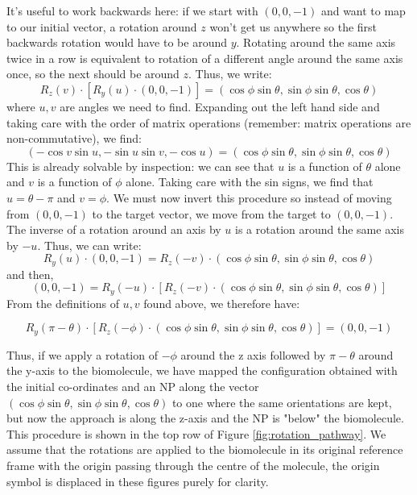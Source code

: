 \documentclass[10pt,a4paper,onecolumn]{report}
\begin{document}
It's useful to work backwards here: if we start with $(0,0,-1)$ and want to map to our initial vector, a rotation around $z$ won't get us anywhere so the first backwards rotation would have to be around $y$. Rotating around the same axis twice in a row is equivalent to rotation of a different angle around the same axis once, so the next should be around $z$. Thus, we write:
\begin{equation}
R_z(v) \cdot \left[R_y(u) \cdot (0,0,-1) \right] = ( \cos \phi \sin \theta,  \sin \phi \sin \theta,  \cos \theta)
\end{equation}
where $u,v$ are angles we need to find. Expanding out the left hand side and taking care with the order of matrix operations (remember: matrix operations are non-commutative), we find:
\begin{equation}
( - \cos v \sin u,  -\sin u \sin v,  -\cos u) = ( \cos \phi \sin \theta,  \sin \phi \sin \theta,  \cos \theta)
\end{equation}
This is already solvable by inspection: we can see that $u$ is a function of $\theta$ alone and $v$ is a function of $\phi$ alone. Taking care with the sin signs, we find that $u = \theta - \pi$ and $v = \phi$. We must now invert this procedure so instead of moving from $(0,0,-1)$ to the target vector, we move from the target to $(0,0,-1)$. The inverse of a rotation around an axis by $u$ is a rotation around the same axis by $-u$. Thus, we can write: 
\begin{equation}
R_y(u) \cdot (0,0,-1)  = R_z(-v) \cdot ( \cos \phi \sin \theta,  \sin \phi \sin \theta,  \cos \theta)
\end{equation}
and then,
\begin{equation}
 (0,0,-1)  =R_y(-u) \cdot \left[ R_z(-v) \cdot ( \cos \phi \sin \theta,  \sin \phi \sin \theta,  \cos \theta) \right]
\end{equation}
From the definitions of $u,v$ found above, we therefore have:

\begin{equation}
 R_y(\pi - \theta) \cdot \left[ R_z(-\phi) \cdot ( \cos \phi \sin \theta,  \sin \phi \sin \theta,  \cos \theta) \right] =  (0,0,-1)
\end{equation}

Thus, if we apply a rotation of $-\phi$ around the z axis followed by $\pi - \theta$ around the y-axis to the biomolecule, we have mapped the configuration obtained with the initial co-ordinates and an NP along the vector $( \cos \phi \sin \theta,  \sin \phi \sin \theta,  \cos \theta)$ to one where the same orientations are kept, but now the approach is along the z-axis and the NP is "below" the biomolecule. This procedure is shown in the top row of Figure   \ref{fig:rotation_pathway}. We assume that the rotations are applied to the biomolecule in its original reference frame with the origin passing through the centre of the molecule, the origin symbol is displaced in these figures purely for clarity. 
\end{document}
